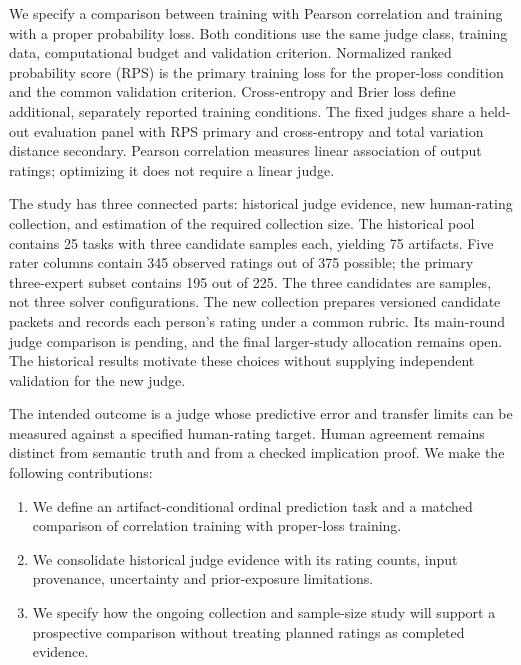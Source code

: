 We specify a comparison between training with Pearson correlation and training with a proper probability loss.
Both conditions use the same judge class, training data, computational budget and validation criterion.
Normalized ranked probability score (RPS) is the primary training loss for the proper-loss condition and the common validation criterion.
Cross-entropy and Brier loss define additional, separately reported training conditions.
The fixed judges share a held-out evaluation panel with RPS primary and cross-entropy and total variation distance secondary.
Pearson correlation measures linear association of output ratings; optimizing it does not require a linear judge.

The study has three connected parts: historical judge evidence, new human-rating collection, and estimation of the required collection size.
The historical pool contains 25 tasks with three candidate samples each, yielding 75 artifacts.
Five rater columns contain 345 observed ratings out of 375 possible; the primary three-expert subset contains 195 out of 225.
The three candidates are samples, not three solver configurations.
The new collection prepares versioned candidate packets and records each person's rating under a common rubric.
Its main-round judge comparison is pending, and the final larger-study allocation remains open.
The historical results motivate these choices without supplying independent validation for the new judge.

The intended outcome is a judge whose predictive error and transfer limits can be measured against a specified human-rating target.
Human agreement remains distinct from semantic truth and from a checked implication proof.
We make the following contributions:
\begin{enumerate}
\item We define an artifact-conditional ordinal prediction task and a matched comparison of correlation training with proper-loss training.
\item We consolidate historical judge evidence with its rating counts, input provenance, uncertainty and prior-exposure limitations.
\item We specify how the ongoing collection and sample-size study will support a prospective comparison without treating planned ratings as completed evidence.
\end{enumerate}
